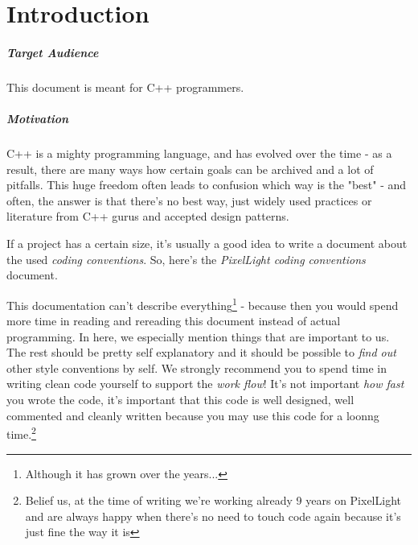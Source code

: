 \chapter{Introduction}


\paragraph{Target Audience}
This document is meant for C++ programmers.


\paragraph{Motivation}
C++ is a mighty programming language, and has evolved over the time - as a result, there are many ways how certain goals can be archived and a lot of pitfalls. This huge freedom often leads to confusion which way is the "best" - and often, the answer is that there's no best way, just widely used practices or literature from C++ gurus and accepted design patterns.

If a project has a certain size, it's usually a good idea to write a document about the used \emph{coding conventions}. So, here's the \emph{PixelLight coding conventions} document.

This documentation can't describe everything\footnote{Although it has grown over the years...} - because then you would spend more time in reading and rereading this document instead of actual programming. In here, we especially mention things that are important to us. The rest should be pretty self explanatory and it should be possible to \emph{find out} other style conventions by self. We strongly recommend you to spend time in writing clean code yourself to support the \emph{work flow}! It's not important \emph{how fast} you wrote the code, it's important that this code is well designed, well commented and cleanly written because you may use this code for a loonng time.\footnote{Belief us, at the time of writing we're working already 9 years on PixelLight and are always happy when there's no need to touch code again because it's just fine the way it is}
